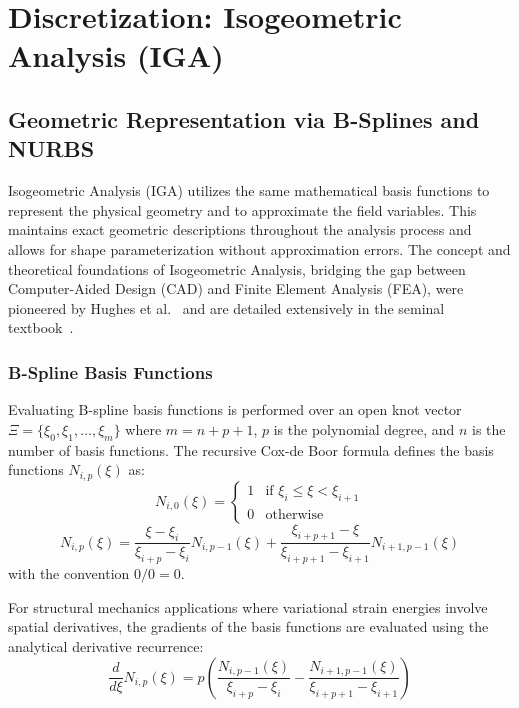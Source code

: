 \chapter{Discretization: Isogeometric Analysis (IGA)}
\label{ch:discretization}

\section{Geometric Representation via B-Splines and NURBS}
Isogeometric Analysis (IGA) utilizes the same mathematical basis functions to represent the physical geometry and to approximate the field variables. This maintains exact geometric descriptions throughout the analysis process and allows for shape parameterization without approximation errors. The concept and theoretical foundations of Isogeometric Analysis, bridging the gap between Computer-Aided Design (CAD) and Finite Element Analysis (FEA), were pioneered by Hughes et al.~\cite{hughes2005} and are detailed extensively in the seminal textbook~\cite{cottrell2009}.

\subsection{B-Spline Basis Functions}
Evaluating B-spline basis functions is performed over an open knot vector $\Xi = \{\xi_0, \xi_1, \dots, \xi_{m}\}$ where $m = n + p + 1$, $p$ is the polynomial degree, and $n$ is the number of basis functions. The recursive Cox-de Boor formula defines the basis functions $N_{i,p}(\xi)$ as:
\begin{equation}
    N_{i,0}(\xi) = \begin{cases} 1 & \text{if } \xi_i \le \xi < \xi_{i+1} \\ 0 & \text{otherwise} \end{cases}
\end{equation}
\begin{equation}
    N_{i,p}(\xi) = \frac{\xi - \xi_i}{\xi_{i+p} - \xi_i} N_{i,p-1}(\xi) + \frac{\xi_{i+p+1} - \xi}{\xi_{i+p+1} - \xi_{i+1}} N_{i+1,p-1}(\xi)
\end{equation}
with the convention $0/0 = 0$.

For structural mechanics applications where variational strain energies involve spatial derivatives, the gradients of the basis functions are evaluated using the analytical derivative recurrence:
\begin{equation}
    \frac{d}{d\xi} N_{i,p}(\xi) = p \left( \frac{N_{i,p-1}(\xi)}{\xi_{i+p} - \xi_i} - \frac{N_{i+1,p-1}(\xi)}{\xi_{i+p+1} - \xi_{i+1}} \right)
\end{equation}

